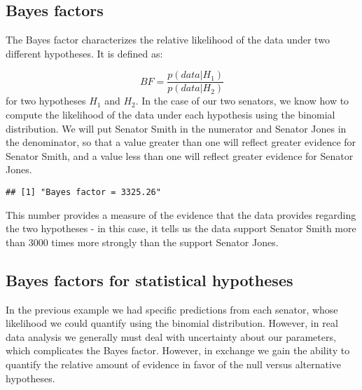 \documentclass[]{book}
\newenvironment{Shaded}{\begin{snugshade}}{\end{snugshade}}
\newcommand{\KeywordTok}[1]{\textcolor[rgb]{0.13,0.29,0.53}{\textbf{#1}}}
\newcommand{\DecValTok}[1]{\textcolor[rgb]{0.00,0.00,0.81}{#1}}
\newcommand{\FloatTok}[1]{\textcolor[rgb]{0.00,0.00,0.81}{#1}}
\newcommand{\StringTok}[1]{\textcolor[rgb]{0.31,0.60,0.02}{#1}}
\newcommand{\CommentTok}[1]{\textcolor[rgb]{0.56,0.35,0.01}{\textit{#1}}}
\newcommand{\OperatorTok}[1]{\textcolor[rgb]{0.81,0.36,0.00}{\textbf{#1}}}
\newcommand{\NormalTok}[1]{#1}
\theoremstyle{definition}
\theoremstyle{definition}
\theoremstyle{definition}
\theoremstyle{remark}
\begin{document}
\subsection{Bayes factors}\label{bayes-factors}

The Bayes factor characterizes the relative likelihood of the data under
two different hypotheses. It is defined as:

\[
BF = \frac{p(data|H_1)}{p(data|H_2)}
\] for two hypotheses \(H_1\) and \(H_2\). In the case of our two
senators, we know how to compute the likelihood of the data under each
hypothesis using the binomial distribution. We will put Senator Smith in
the numerator and Senator Jones in the denominator, so that a value
greater than one will reflect greater evidence for Senator Smith, and a
value less than one will reflect greater evidence for Senator Jones.

\begin{Shaded}
\end{Shaded}

\begin{verbatim}
## [1] "Bayes factor = 3325.26"
\end{verbatim}

This number provides a measure of the evidence that the data provides
regarding the two hypotheses - in this case, it tells us the data
support Senator Smith more than 3000 times more strongly than the
support Senator Jones.

\subsection{Bayes factors for statistical
hypotheses}\label{bayes-factors-for-statistical-hypotheses}

In the previous example we had specific predictions from each senator,
whose likelihood we could quantify using the binomial distribution.
However, in real data analysis we generally must deal with uncertainty
about our parameters, which complicates the Bayes factor. However, in
exchange we gain the ability to quantify the relative amount of evidence
in favor of the null versus alternative hypotheses.
\end{document}
